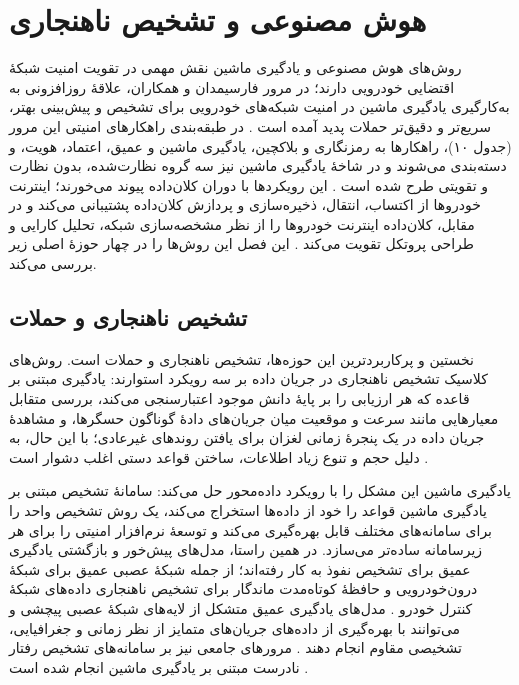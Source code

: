 \section{هوش مصنوعی و تشخیص ناهنجاری}

روش‌های هوش مصنوعی و یادگیری ماشین نقش مهمی در تقویت امنیت شبکهٔ اقتضایی خودرویی دارند؛ در مرور فارسیمدان و همکاران، علاقهٔ روزافزونی به به‌کارگیری یادگیری ماشین در امنیت شبکه‌های خودرویی برای تشخیص و پیش‌بینی بهتر، سریع‌تر و دقیق‌تر حملات پدید آمده است \cite{farsimadanReviewSecurityChallenges2025}. در طبقه‌بندی راهکارهای امنیتی این مرور (جدول ۱۰)، راهکارها به رمزنگاری و بلاکچین، یادگیری ماشین و عمیق، اعتماد، هویت، و  دسته‌بندی می‌شوند و در شاخهٔ یادگیری ماشین نیز سه گروه نظارت‌شده، بدون نظارت و تقویتی طرح شده است \cite{farsimadanReviewSecurityChallenges2025}. این رویکردها با دوران کلان‌داده پیوند می‌خورند؛ اینترنت خودروها از اکتساب، انتقال، ذخیره‌سازی و پردازش کلان‌داده پشتیبانی می‌کند و در مقابل، کلان‌داده اینترنت خودروها را از نظر مشخصه‌سازی شبکه، تحلیل کارایی و طراحی پروتکل تقویت می‌کند \cite{xuInternetVehiclesBig2018}. این فصل این روش‌ها را در چهار حوزهٔ اصلی زیر بررسی می‌کند.

\subsection{تشخیص ناهنجاری و حملات}

نخستین و پرکاربردترین این حوزه‌ها، تشخیص ناهنجاری و حملات است. روش‌های کلاسیک تشخیص ناهنجاری در جریان داده بر سه رویکرد استوارند: یادگیری مبتنی بر قاعده که هر ارزیابی را بر پایهٔ دانش موجود اعتبارسنجی می‌کند، بررسی متقابل معیارهایی مانند سرعت و موقعیت میان جریان‌های دادهٔ گوناگون حسگرها، و مشاهدهٔ جریان داده در یک پنجرهٔ زمانی لغزان برای یافتن روندهای غیرعادی؛ با این حال، به دلیل حجم و تنوع زیاد اطلاعات، ساختن قواعد دستی اغلب دشوار است \cite{farsimadanReviewSecurityChallenges2025}.

یادگیری ماشین این مشکل را با رویکرد داده‌محور حل می‌کند: سامانهٔ تشخیص مبتنی بر یادگیری ماشین قواعد را خود از داده‌ها استخراج می‌کند، یک روش تشخیص واحد را برای سامانه‌های مختلف قابل بهره‌گیری می‌کند و توسعهٔ نرم‌افزار امنیتی را برای هر زیرسامانه ساده‌تر می‌سازد. در همین راستا، مدل‌های پیش‌خور و بازگشتی یادگیری عمیق برای تشخیص نفوذ به کار رفته‌اند؛ از جمله شبکهٔ عصبی عمیق برای شبکهٔ درون‌خودرویی و حافظهٔ کوتاه‌مدت ماندگار  برای تشخیص ناهنجاری داده‌های شبکهٔ کنترل خودرو \cite{farsimadanReviewSecurityChallenges2025}. مدل‌های یادگیری عمیق متشکل از لایه‌های شبکهٔ عصبی پیچشی  و  می‌توانند با بهره‌گیری از داده‌های جریان‌های متمایز از نظر زمانی و جغرافیایی، تشخیصی مقاوم انجام دهند \cite{farsimadanReviewSecurityChallenges2025}. مرورهای جامعی نیز بر سامانه‌های تشخیص رفتار نادرست مبتنی بر یادگیری ماشین انجام شده است \cite{farsimadanReviewSecurityChallenges2025}.

